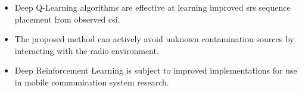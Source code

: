 \begin{itemize}
    \item Deep Q-Learning algorithms are effective at learning improved \gls{srs} sequence placement from observed \gls{csi}. 
    \item The proposed method can actively avoid unknown contamination sources by interacting with the radio environment. 
    \item Deep Reinforcement Learning is subject to improved implementations for use in mobile communication system research. 
\end{itemize}


